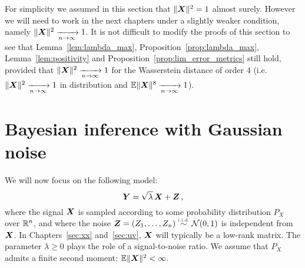 \documentclass[12pt,nocut]{article}
\begin{document}
\begin{remark}\label{rem:cosine}
For simplicity we assumed in this section that $\|{\boldsymbol X}\|^2 = 1$ almost surely. However we will need to work in the next chapters under a slightly weaker condition, namely $\|{\boldsymbol X}\|^2 \xrightarrow[n \to \infty]{} 1$. It is not difficult to modify the proofs of this section to see that Lemma~\ref{lem:lambda_max}, Proposition~\ref{prop:lambda_max}, Lemma~\ref{lem:positivity} and Proposition~\ref{prop:lim_error_metrics} still hold, provided that $\|{\boldsymbol X}\|^2 \xrightarrow[n \to \infty]{} 1$ for the Wasserstein distance of order $4$ (i.e.\ $\|{\boldsymbol X}\|^2 \xrightarrow[n \to \infty]{} 1$ in distribution and $\mathbb{E} \|{\boldsymbol X}\|^8 \xrightarrow[n \to \infty]{} 1$).
\end{remark}



\section{Bayesian inference with Gaussian noise}\label{sec:i_mmse}

We will now focus on the following model:
\begin{equation}\label{eq:inference}
	{\boldsymbol Y} = \sqrt{\lambda} \, {\boldsymbol X} + {\boldsymbol Z} \,,
\end{equation}
where the signal ${\boldsymbol X}$ is sampled according to some probability distribution $P_X$ over $\mathbb{R}^n$, and where the noise ${\boldsymbol Z} =(Z_1, \dots, Z_n) \overset{\text{\tiny i.i.d.}}{\sim} \mathcal{N}(0,1)$ is independent from ${\boldsymbol X}$. In Chapters~\ref{sec:xx} and~\ref{sec:uv}, ${\boldsymbol X}$ will typically be a low-rank matrix. The parameter $\lambda \geq 0$ plays the role of a signal-to-noise ratio.
We assume that $P_X$ admits a finite second moment: $\mathbb{E} \|{\boldsymbol X}\|^2 < \infty$.
\end{document}
